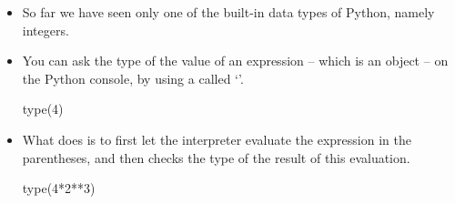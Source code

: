 \documentclass[a4paper]{article}
\begin{document}
\begin{itemize}
\item So far we have seen only one of the built-in data types of Python, namely
integers.

\item You can ask the type of the value of an expression -- which is an object
-- on the Python console, by using a  called `'. 

\begin{ucodeframe}
\begin{pyconsole}
type(4)
\end{pyconsole}
\end{ucodeframe}

\item What  does is to first let the interpreter evaluate the
expression in the parentheses, and then checks the type of the result of this
evaluation.

\begin{ucodeframe}
\begin{pyconsole}
type(4*2**3)
\end{pyconsole}
\end{ucodeframe}

\end{itemize}
\end{document}
